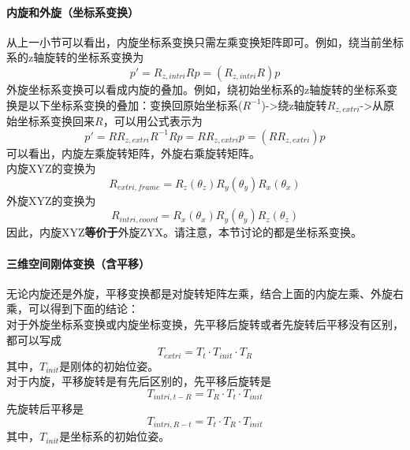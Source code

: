 \documentclass{ctexart}
\begin{document}
	\paragraph{内旋和外旋（坐标系变换）}
	从上一小节可以看出，内旋坐标系变换只需左乘变换矩阵即可。例如，绕当前坐标系的z轴旋转的坐标系变换为
	\begin{equation}
	p' = R_{z,intri} R p = (R_{z,intri} R) p
	\end{equation}
	外旋坐标系变换可以看成内旋的叠加。例如，绕初始坐标系的z轴旋转的坐标系变换是以下坐标系变换的叠加：变换回原始坐标系($R^{-1}$)->绕z轴旋转$R_{z,extri}$->从原始坐标系变换回来$R$，可以用公式表示为
	\begin{equation}
	p' = R R_{z,extri} R^{-1} R p = R R_{z,extri} p = (R R_{z,extri}) p
	\end{equation}
	可以看出，内旋左乘旋转矩阵，外旋右乘旋转矩阵。\\
	内旋XYZ的变换为
	\begin{equation}
	R_{extri,frame}=R_z(\theta_z) R_y(\theta_y) R_x(\theta_x)
	\end{equation}
	外旋XYZ的变换为
	\begin{equation}
	R_{intri,coord}=R_x(\theta_x) R_y(\theta_y) R_z(\theta_z)
	\end{equation}
	因此，内旋XYZ\textbf{等价于}外旋ZYX。请注意，本节讨论的都是坐标系变换。
	
	\paragraph{三维空间刚体变换（含平移）}
	无论内旋还是外旋，平移变换都是对旋转矩阵左乘，结合上面的内旋左乘、外旋右乘，可以得到下面的结论：\\
	对于外旋坐标系变换或内旋坐标变换，先平移后旋转或者先旋转后平移没有区别，都可以写成
	\begin{equation}
	T_{extri} = T_t \cdot T_{init} \cdot T_R
	\end{equation}
	其中，$T_{init}$是刚体的初始位姿。\\
	对于内旋，平移旋转是有先后区别的，先平移后旋转是
	\begin{equation}
		T_{intri,t-R} = T_R \cdot T_t \cdot T_{init}
	\end{equation}
	先旋转后平移是
	\begin{equation}
	T_{intri,R-t} = T_t \cdot T_R \cdot T_{init}
	\end{equation}
	其中，$T_{init}$是坐标系的初始位姿。
	
\end{document}
